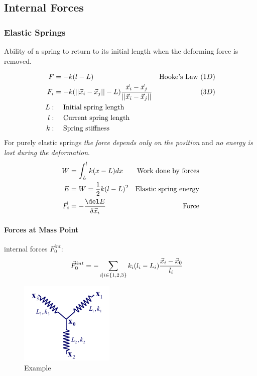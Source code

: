 \begin{multicols}{2}
\subsection{Internal Forces}
\subsubsection{Elastic Springs}
\begin{definition}[Elasticity]
	Ability of a spring to return to its initial length when the deforming force is removed. 
\end{definition}

\begin{align*}
	F & =-k(l-L) & \text{Hooke's Law } (1D)\\
	F_i &= -k(||\vec x_i - \vec x_j || - L) {\vec x_i - \vec x_j \over ||\vec x_i - \vec x_j || } & (3D)\\
	L: &\quad \text{ Initial spring length}\\
	l: &\quad \text{ Current spring length}\\
	k: &\quad \text{ Spring stiffness}
\end{align*}
For purely elastic springs \emph{the force depends only on the position} and \emph{no energy is lost during the deformation}.
\begin{align*}
	W &=\int_L^l k(x-L) dx &\text{Work done by forces}\\
	E &= W= {1 \over 2} k(l-L)^2 &\text{Elastic spring energy}\\
	\vec F_i &= -{\del E \over \delta \vec x_i} &\text{Force}
\end{align*}

\paragraph{Forces at Mass Point} internal forces $F_0^{int}$:
\begin{align*}
	\vec F_0^{int} &= -\sum_{i|i\in \{1,2,3\}} k_i (l_i-L_i) {\vec x_i - \vec x_0 \over l_i}
\end{align*}
\begin{figure}[H]
	\centering
	\includegraphics[width=0.4\textwidth]{img/01_forces_at_mass_point.pdf}
	\caption{Example}
\end{figure}


\end{multicols}
